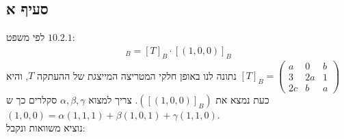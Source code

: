 \documentclass{article}
\begin{document}
\subsection*{סעיף א}

לפי משפט $10.2.1$:
\begin{align*}
    [T(1,0,0)]_B=[T]_B\cdot [(1,0,0)]_B
\end{align*}
נתונה לנו באופן חלקי המטריצה המייצגת של ההעתקה $T$, והיא $[T]_B=\begin{pmatrix}
        a  & 0  & b \\
        3  & 2a & 1 \\
        2c & b  & a
    \end{pmatrix}$ \\
כעת נמצא את $([(1,0,0)]_B)$. צריך למצוא $\alpha, \beta, \gamma$ סקלרים כך ש $(1,0,0)=\alpha (1,1,1) + \beta (1,0,1) + \gamma (1,1,0)$. \\
נוציא משוואות ונקבל:
\end{document}
